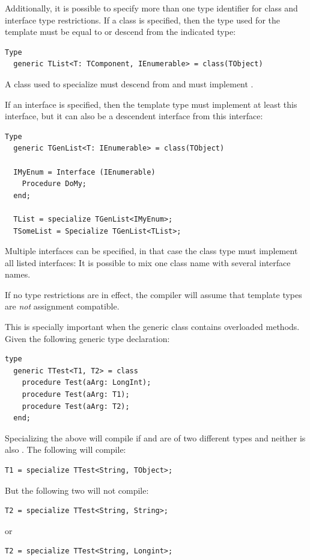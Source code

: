 Additionally, it is possible to specify more than one type identifier for class and interface type restrictions.
If a class is specified, then the type used for the template must be equal to or descend from the indicated type:
\begin{verbatim}
Type
  generic TList<T: TComponent, IEnumerable> = class(TObject)
\end{verbatim}
A class used to specialize  must descend from  and must implement .

If an interface is specified, then the template type must implement at least this interface, but it can also be a descendent interface from this interface:
\begin{verbatim}
Type
  generic TGenList<T: IEnumerable> = class(TObject)

  IMyEnum = Interface (IEnumerable)
    Procedure DoMy;
  end;

  TList = specialize TGenList<IMyEnum>;
  TSomeList = Specialize TGenList<TList>;
\end{verbatim}

Multiple interfaces can be specified, in that case the class type must implement all listed interfaces:
It is possible to mix one class name with several interface names.

If no type restrictions are in effect, the compiler will assume that template types are {\em not} assignment compatible.

This is specially important when the generic class contains overloaded methods. Given the following generic type declaration:
\begin{verbatim}
type
  generic TTest<T1, T2> = class
    procedure Test(aArg: LongInt);
    procedure Test(aArg: T1);
    procedure Test(aArg: T2);
  end;
\end{verbatim}
Specializing the above will compile if  and  are of two different types and neither is also .
The following will compile:
\begin{verbatim}
T1 = specialize TTest<String, TObject>;
\end{verbatim}
But the following two will not compile:
\begin{verbatim}
T2 = specialize TTest<String, String>;
\end{verbatim}
or
\begin{verbatim}
T2 = specialize TTest<String, Longint>;
\end{verbatim}
